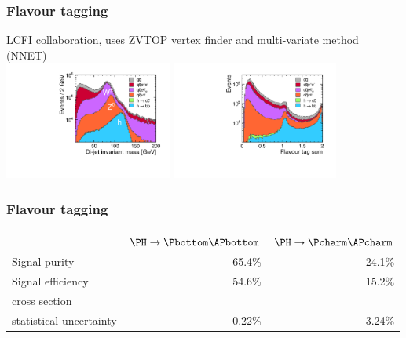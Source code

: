 \documentclass{beamer}
\begin{document}
\begin{frame}
\frametitle{Flavour tagging}
LCFI collaboration, uses ZVTOP vertex finder and multi-variate method (NNET)\\
\includegraphics[width=5.5cm]{Invariant_Mass_All.pdf}
\includegraphics[width=5.5cm]{B_Flavour_Tag_Sum.pdf}
\end{frame}
\begin{frame}
\frametitle{Flavour tagging}
\begin{center}
\begin{tabular}{l r r}
        \toprule
        & \textbf{$\PH\to \Pbottom\APbottom$} & \textbf{$\PH\to
        \Pcharm\APcharm$}
        \\
        \midrule
        Signal purity       & 65.4\% & 24.1\%  \\
        Signal efficiency   & 54.6\% & 15.2\%  \\
        cross section & & \\statistical uncertainty   & 0.22\% & 3.24\% \\
        \bottomrule
    \end{tabular}
    \end{center}
\end{frame}
\end{document}
